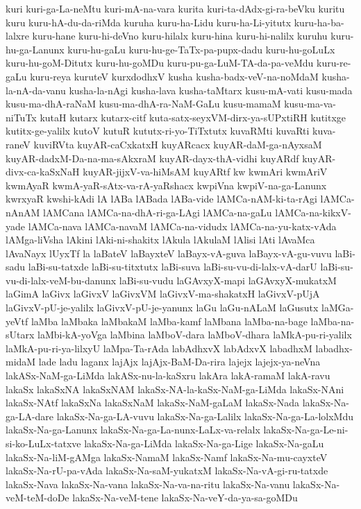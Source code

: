 {kuri
kuri-ga-La-neMtu
kuri-mA-na-vara
kurita
kuri-ta-dAdx-gi-ra-beVku
kuritu
kuru
kuru-hA-du-da-riMda
kuruha
kuru-ha-Lidu
kuru-ha-Li-yitutx
kuru-ha-ba-lalxre
kuru-hane
kuru-hi-deVno
kuru-hilalx
kuru-hina
kuru-hi-nalilx
kuruhu
kuru-hu-ga-Lanunx
kuru-hu-gaLu
kuru-hu-ge-TaTx-pa-pupx-dadu
kuru-hu-goLuLx
kuru-hu-goM-Ditutx
kuru-hu-goMDu
kuru-pu-ga-LuM-TA-da-pa-veMdu
kuru-re-gaLu
kuru-reya
kuruteV
kurxdodhxV
kusha
kusha-badx-veV-na-noMdaM
kusha-la-nA-da-vanu
kusha-la-nAgi
kusha-lava
kusha-taMtarx
kusu-mA-vati
kusu-mada
kusu-ma-dhA-raNaM
kusu-ma-dhA-ra-NaM-GaLu
kusu-mamaM
kusu-ma-va-niTuTx
kutaH
kutarx
kutarx-citf
kuta-satx-seyxVM-dirx-ya-sUPxtiRH
kutitxge
kutitx-ge-yalilx
kutoV
kutuR
kututx-ri-yo-TiTxtutx
kuvaRMti
kuvaRti
kuva-raneV
kuviRVta
kuyAR-caCxkatxH
kuyARcacx
kuyAR-daM-ga-nAyxsaM
kuyAR-dadxM-Da-na-ma-sAkxraM
kuyAR-dayx-thA-vidhi
kuyARdf
kuyAR-divx-ca-kaSxNaH
kuyAR-jijxV-va-hiMsAM
kuyARtf
kw
kwmAri
kwmAriV
kwmAyaR
kwmA-yaR-sAtx-va-rA-yaRshacx
kwpiVna
kwpiV-na-ga-Lanunx
kwrxyaR
kwshi-kAdi
lA
lABa
lABada
lABa-vide
lAMCa-nAM-ki-ta-rAgi
lAMCa-nAnAM
lAMCana
lAMCa-na-dhA-ri-ga-LAgi
lAMCa-na-gaLu
lAMCa-na-kikxV-yade
lAMCa-nava
lAMCa-navaM
lAMCa-na-vidudx
lAMCa-na-yu-katx-vAda
lAMga-liVsha
lAkini
lAki-ni-shakitx
lAkula
lAkulaM
lAlisi
lAti
lAvaMca
lAvaNayx
lUyxTf
la
laBateV
laBayxteV
laBayx-vA-guva
laBayx-vA-gu-vuvu
laBi-sadu
laBi-su-tatxde
laBi-su-titxtutx
laBi-suva
laBi-su-vu-di-lalx-vA-darU
laBi-su-vu-di-lalx-veM-bu-danunx
laBi-su-vudu
laGAvxyX-mapi
laGAvxyX-mukatxM
laGimA
laGivx
laGivxV
laGivxVM
laGivxV-ma-shakatxH
laGivxV-pUjA
laGivxV-pU-je-yalilx
laGivxV-pU-je-yanunx
laGu
laGu-nALaM
laGusutx
laMGa-yeVtf
laMba
laMbaka
laMbakaM
laMba-kamf
laMbana
laMba-na-bage
laMba-na-sUtarx
laMbi-kA-yoVga
laMbina
laMboV-dara
laMboV-dhara
laMkA-pu-ri-yalilx
laMkA-pu-ri-ya-lilxyU
laMpa-Ta-rAda
labAdhxvX
labAdxvX
labadhxM
labadhx-midaM
lade
ladu
laganx
lajAjx
lajAjx-BaM-Da-rira
lajejx
lajejx-ya-neVna
lakASx-NaM-ga-LiMda
lakASx-nu-la-kaSxru
lakAra
lakA-ramaM
lakA-ravu
lakaSx
lakaSxNA
lakaSxNAM
lakaSx-NA-la-kaSx-NaM-ga-LiMda
lakaSx-NAni
lakaSx-NAtf
lakaSxNa
lakaSxNaM
lakaSx-NaM-gaLaM
lakaSx-Nada
lakaSx-Na-ga-LA-dare
lakaSx-Na-ga-LA-vuvu
lakaSx-Na-ga-Lalilx
lakaSx-Na-ga-La-lolxMdu
lakaSx-Na-ga-Lanunx
lakaSx-Na-ga-La-nunx-LaLx-va-relalx
lakaSx-Na-ga-Le-ni-si-ko-LuLx-tatxve
lakaSx-Na-ga-LiMda
lakaSx-Na-ga-Lige
lakaSx-Na-gaLu
lakaSx-Na-liM-gAMga
lakaSx-NamaM
lakaSx-Namf
lakaSx-Na-mu-cayxteV
lakaSx-Na-rU-pa-vAda
lakaSx-Na-saM-yukatxM
lakaSx-Na-vA-gi-ru-tatxde
lakaSx-Nava
lakaSx-Na-vana
lakaSx-Na-va-na-ritu
lakaSx-Na-vanu
lakaSx-Na-veM-teM-doDe
lakaSx-Na-veM-tene
lakaSx-Na-veY-da-ya-sa-goMDu
}
